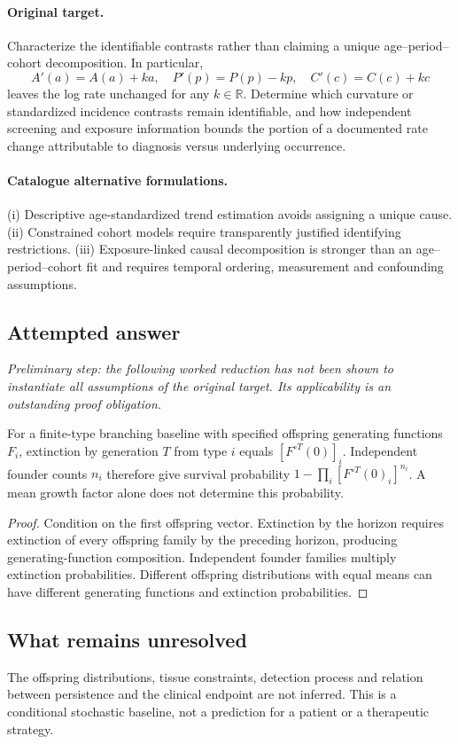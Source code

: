 \documentclass[11pt]{article}
\begin{document}
\paragraph{Original target.}
Characterize the identifiable contrasts rather than claiming a unique age--period--cohort decomposition. In particular,
    \[A'(a)=A(a)+ka,\quad P'(p)=P(p)-kp,\quad C'(c)=C(c)+kc\]
    leaves the log rate unchanged for any $k\in\mathbb{R}$. Determine which curvature or standardized incidence contrasts remain identifiable, and how independent screening and exposure information bounds the portion of a documented rate change attributable to diagnosis versus underlying occurrence.
\paragraph{Catalogue alternative formulations.}
(i) Descriptive age-standardized trend estimation avoids assigning a unique cause. (ii) Constrained cohort models require transparently justified identifying restrictions. (iii) Exposure-linked causal decomposition is stronger than an age--period--cohort fit and requires temporal ordering, measurement and confounding assumptions.
\subsection{Attempted answer}
\noindent\emph{Preliminary step: the following worked reduction has not been shown to instantiate all assumptions of the original target. Its applicability is an outstanding proof obligation.}

\begin{proposition}
For a finite-type branching baseline with specified offspring generating functions $F_i$, extinction by generation $T$ from type $i$ equals $[F^{\circ T}(0)]_i$. Independent founder counts $n_i$ therefore give survival probability $1-\prod_i[F^{\circ T}(0)_i]^{n_i}$. A mean growth factor alone does not determine this probability.
\end{proposition}
\begin{proof}
Condition on the first offspring vector. Extinction by the horizon requires extinction of every offspring family by the preceding horizon, producing generating-function composition. Independent founder families multiply extinction probabilities. Different offspring distributions with equal means can have different generating functions and extinction probabilities.
\end{proof}
\subsection{What remains unresolved}
The offspring distributions, tissue constraints, detection process and relation between persistence and the clinical endpoint are not inferred. This is a conditional stochastic baseline, not a prediction for a patient or a therapeutic strategy.
\end{document}
